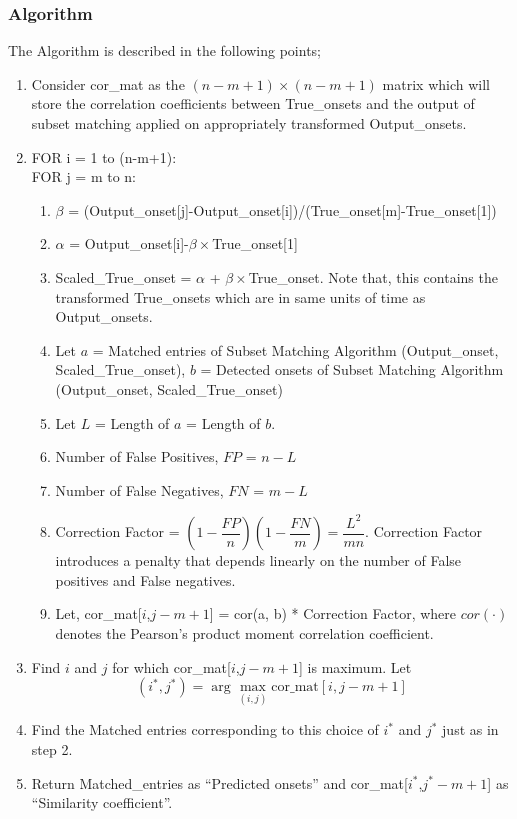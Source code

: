\documentclass[10pt]{article}
\begin{document}
\subsubsection{Algorithm}
The Algorithm is described in the following points;
\begin{enumerate}
    \item Consider cor\_mat as the $(n-m+1)\times(n-m+1)$ matrix which will store the correlation coefficients between True\_onsets and the output of subset matching applied on appropriately transformed Output\_onsets.
    \item FOR i = 1 to (n-m+1):\\
    FOR j = m to n:
    \begin{enumerate}
        \item $\beta$ = (Output\_onset[j]-Output\_onset[i])/(True\_onset[m]-True\_onset[1])
        \item $\alpha$ = Output\_onset[i]-$\beta\times$True\_onset[1]
        \item Scaled\_True\_onset = $\alpha$ + $\beta\times$True\_onset. Note that, this contains the transformed True\_onsets which are in same units of time as Output\_onsets.
        \item Let $a$ = Matched entries of Subset Matching Algorithm (Output\_onset, Scaled\_True\_onset), $b$ = Detected onsets of Subset Matching Algorithm (Output\_onset, Scaled\_True\_onset)
        \item Let $L$ = Length of $a$ = Length of $b$.
        \item Number of False Positives, $FP$ = $n - L$ 
	    \item Number of False Negatives, $FN$ = $m - L$
	    \item Correction Factor = $(1 - \dfrac{FP}{n})(1 - \dfrac{FN}{m}) = \dfrac{L^2}{mn}$. Correction Factor introduces a penalty that depends linearly on the number of False positives and False negatives.
	    \item Let, cor\_mat[$i$,$j-m+1$] = cor(a, b) * Correction Factor, where $cor(\cdot)$ denotes the Pearson's product moment correlation coefficient.
    \end{enumerate}
    \item Find $i$ and $j$ for which cor\_mat[$i$,$j-m+1$] is maximum. Let $$(i^*, j^*) = \arg\max_{(i,j)}\text{cor\_mat}[i,j-m+1]$$
    \item Find the Matched entries corresponding to this choice of $i^*$ and $j^*$ just as in step 2.
    \item Return Matched\_entries as “Predicted onsets” and cor\_mat[$i^*$,$j^*-m+1$] as “Similarity coefficient”.
\end{enumerate}
\end{document}
